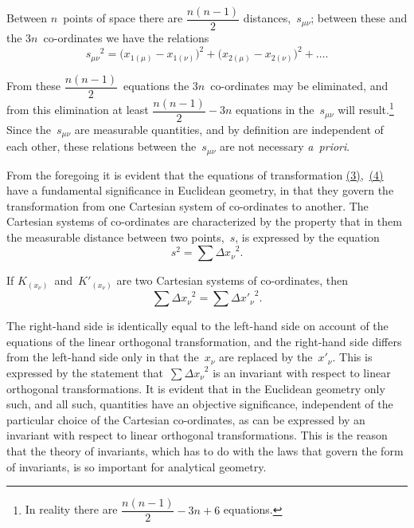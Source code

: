 \documentclass[12pt]{book}[2005/09/16]
\newcommand{\Change}[2]{#2}
\newcommand{\Add}[1]{\Change{}{#1}}
\newcommand{\PageSep}[1]{\ignorespaces}
\newcommand{\Eqref}[1]{\hyperref[eqn:#1]{#1}}
\begin{document}
Between $n$~points of space there are $\dfrac{n(n - 1)}{2}$ distances,~$s_{\mu\nu}$;
between these and the $3n$~co-ordinates we have the
relations
\[
{s_{\mu\nu}}^{2}
  = \bigl(x_{1(\mu)} - x_{1(\nu)}\bigr)^{2}
  + \bigl(x_{2(\mu)} - x_{2(\nu)}\bigr)^{2}
  + \dots\Add{.}
\]

From these $\dfrac{n(n - 1)}{2}$~equations the $3n$~co-ordinates
may be eliminated, and from this elimination at least
$\dfrac{n(n - 1)}{2} - 3n$ equations in the~$s_{\mu\nu}$ will result.\footnote
  {In reality there are $\dfrac{n(n - 1)}{2} - 3n + 6$ equations.}
Since
the~$s_{\mu\nu}$ are measurable quantities, and by definition are
independent of each other, these relations between the~$s_{\mu\nu}$
are not necessary \textit{a~priori}.

From the foregoing it is evident that the equations of
transformation \Eqref{(3)},~\Eqref{(4)} have a fundamental significance in
Euclidean geometry, in that they govern the transformation
from one Cartesian system of co-ordinates to another.
The Cartesian systems of co-ordinates are characterized
\PageSep{10}
by the property that in them the measurable distance
between two points,~$s$, is expressed by the equation
\[
s^{2} = \sum {\Delta x_{\nu}}^{2}.
\]

If $K_{(x_{\nu})}$~and~$K'_{(x_{\nu})}$ are two Cartesian systems of co-ordinates,
then
\[
\sum {\Delta x_{\nu}}^{2} =  \sum {{\Delta x'}_{\nu}}^{2}.
\]

The right-hand side is identically equal to the left-hand
side on account of the equations of the linear orthogonal
transformation, and the right-hand side differs from the
left-hand side only in that the~$x_{\nu}$ are replaced by the~${x'}_{\nu}$.
This is expressed by the statement that~$\sum {\Delta x_{\nu}}^{2}$ is an
invariant with respect to linear orthogonal transformations.
%
It is evident that in the Euclidean geometry only
such, and all such, quantities have an objective significance,
independent of the particular choice of the Cartesian
co-ordinates, as can be expressed by an invariant with
respect to linear orthogonal transformations. This is the
reason that the theory of invariants, which has to do with
the laws that govern the form of invariants, is so important
for analytical geometry.
\end{document}
